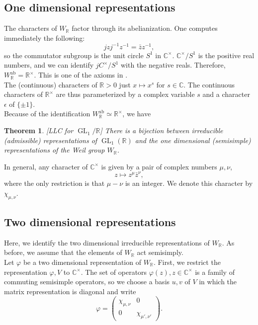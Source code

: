 \documentclass{amsart}
\numberwithin{equation}{section}
\theoremstyle{plain}
\newtheorem{theorem}{Theorem}[section]
\theoremstyle{definition}
\theoremstyle{remark}
\renewcommand{\_}[2]{\underbrace{#1}_{#2}}
\renewcommand{\^}[2]{\overbrace{#1}_{#2}}
\newcommand{\R}{\mathbb{R}}
\newcommand{\C}{\mathbb{C}}
\newcommand{\GL}{\operatorname{GL}}
\begin{document}
\subsection{One dimensional representations}
The characters of $W_\R$ factor through its abelianization. One computes immediately the following:
\[jzj^{-1}z^{-1} = \bar z z^{-1},\] so the commutator subgroup is the unit circle $S^1$ in $\C^\times$. $\C^\times/S^1$ is the positive real numbers, and we can identify $jC^\times/S^1$ with the negative reals. Therefore, $W_\R^{\text{ab}} = \R^\times$. This is one of the axioms in \cite{tate}.\\

The (continuous) characters of $\R>0$ just $x\mapsto x^s$ for $s\in \C$. The continuous characters of $\R^\times$ are thus parameterized by a complex variable $s$ and a character $\epsilon$ of $\{\pm 1\}$. \\

Because of the identification $W_\R^\text{ab} \simeq \R^\times$, we have 

\begin{theorem}\label{thm:llcgl1}[LLC for $\GL_1/\R$] There is a bijection between irreducible (admissible) representations of $\GL_1(\R)$ and the one dimensional (semisimple) representations of the Weil group $W_\R$.
\end{theorem}

In general, any character of $\C^\times$ is given by a pair of complex numbers $\mu, \nu$, \[z \mapsto z^\mu \bar z^\nu,\]  where the only restriction is that $\mu - \nu$ is an integer. We denote this character by $\chi_{\mu,\nu}$. 

\subsection{Two dimensional representations}
Here, we identify the two dimensional irreducible representations of $W_\R$. As before, we assume that the elements of $W_\R$ act semisimply. \\

Let $\varphi$ be a two dimensional representation of $W_\R$. First, we restrict the representation $\varphi, V$ to $\C^\times$. The set of operators $\varphi(z), z \in \C^\times$ is a family of commuting semisimple operators, so we choose a basis $u,v$ of $V$ in which the matrix representation is diagonal and write \[\varphi =
  \begin{pmatrix}
    \chi_{\mu, \nu} & 0 \\
    0 & \chi_{\mu', \nu'}
  \end{pmatrix}.\]
\end{document}
